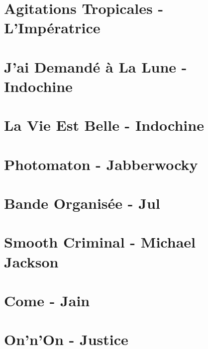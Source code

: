 \documentclass[11pt]{article}
\begin{document}
\section{Agitations Tropicales - L'Impératrice}




\section{J'ai Demandé à La Lune - Indochine}



\section{La Vie Est Belle - Indochine}
\begin{guitar}

\end{guitar}

\section{Photomaton - Jabberwocky}
\begin{guitar}

\end{guitar}

\section{Bande Organisée - Jul}


\section{Smooth Criminal - Michael Jackson}
\begin{guitar}

\end{guitar}

\section{Come - Jain}
\begin{guitar}

\end{guitar}

\section{On'n'On - Justice}

\end{document}
